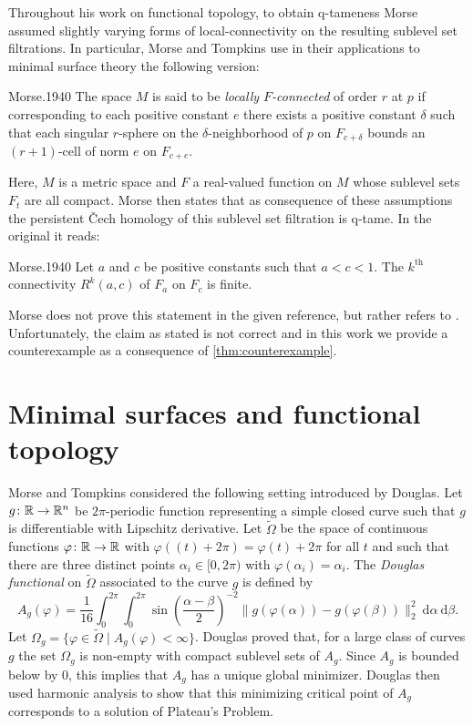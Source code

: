 
Throughout his work on functional topology, to obtain q-tameness Morse assumed slightly varying forms of local-connectivity on the resulting sublevel set filtrations.
In particular, Morse and Tompkins use in their applications to minimal surface theory the following version:
\begin{displaycquote}[p.431]{Morse.1940}
	The space $M$ is said to be \textit{locally $F$-connected} of order $r$ at $p$ if corresponding to each positive constant $e$ there exists a positive constant $\delta$ such that each singular $r$-sphere on the $\delta$-neighborhood of $p$ on $F_{c+\delta}$ bounds an $(r+1)$-cell of norm $e$ on $F_{c+e}$.
\end{displaycquote}
Here, $M$ is a metric space and $F$ a real-valued function on $M$ whose sublevel sets $F_{t}$ are all compact.
Morse then states that as consequence of these assumptions the persistent \v{C}ech homology of this sublevel set filtration is q-tame.
In the original it reads:
\begin{displaycquote}[Theorem 6.3, p.432]{Morse.1940}
	Let $a$ and $c$ be positive constants such that $a < c < 1$.
	The $k^{\mathrm{th}}$ connectivity $R^k(a,c)$ of $F_a$ on $F_c$ is finite.
\end{displaycquote}
Morse does not prove this statement in the given reference, but rather refers to \cite[Theorem 6.1]{Morse.1938}.
Unfortunately, the claim as stated is not correct and in this work we provide a counterexample as a consequence of \cref{thm:counterexample}.

\section{Minimal surfaces and functional topology} \label{s:surfaces}

Morse and Tompkins considered the following setting introduced by Douglas.
Let $g \colon \mathbb{R} \to \mathbb{R}^n$ be $2\pi$-periodic function representing a simple closed curve such that $g$ is differentiable with Lipschitz derivative.
Let $\widetilde{\Omega}$ be the space of continuous functions $\varphi \colon \mathbb{R} \to \mathbb{R}$ with $\varphi((t)+2\pi) = \varphi(t) + 2\pi$ for all $t$ and such that there are three distinct points $\alpha_i \in [0,2\pi)$ with $\varphi(\alpha_i)=\alpha_i$.
The \emph{Douglas functional} on $\widetilde \Omega$ associated to the curve $g$ is defined by
\begin{equation*}
A_g(\varphi)=\frac{1}{16}\int_0^{2\pi}\int_0^{2\pi}\sin\left(\frac{\alpha-\beta}{2}\right)^{-2} \! \lVert g(\varphi(\alpha))-g(\varphi(\beta)) \rVert_2^2 \ \mathrm{d}\alpha \ \mathrm{d}\beta.
\end{equation*}
Let $\Omega_g=\{\varphi\in\widetilde\Omega\mid A_g(\varphi)<\infty\}$.
Douglas proved that, for a large class of curves $g$ the set $\Omega_g$ is non-empty with compact sublevel sets of $A_g$.
Since $A_g$ is bounded below by $0$, this implies that $A_g$ has a unique global minimizer.
Douglas then used harmonic analysis to show that this minimizing critical point of $A_g$ corresponds to a solution of Plateau's Problem.

